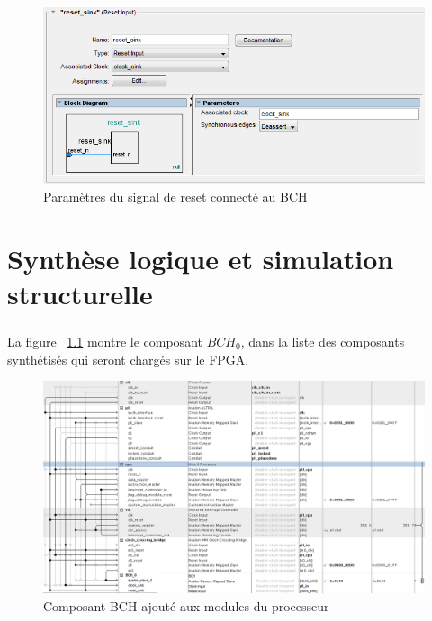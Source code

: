 \documentclass[a4paper, 11pt, svgnames]{report}
\begin{document}
        \begin{figure}[H]
            \centering
            \includegraphics[width=\textwidth]{./images/reset_sink}
            \caption{Paramètres du signal de reset connecté au BCH}
            \label{fig:reset_sink}
        \end{figure}

    \chapter{Synthèse logique et simulation structurelle}
        \paragraph{}
        La figure ~\ref{fig:BCH_0_component} montre le composant $BCH_0$, dans
        la liste des composants synthétisés qui seront chargés sur le FPGA.

        \begin{figure}[H]
            \centering
            \includegraphics[width=\textwidth]{./images/BCH_0_component}
            \caption{Composant BCH ajouté aux modules du processeur}
            \label{fig:BCH_0_component}
        \end{figure}
\end{document}
